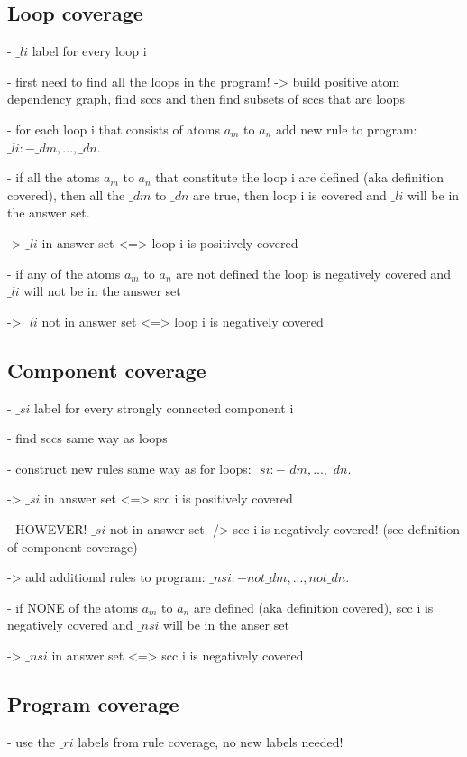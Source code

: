 \subsection{Loop coverage}
\label{subsec:Computing coverage metrics for propositional programs/General approach/Loop coverage}
- $\_li$ label for every loop i

- first need to find all the loops in the program! -> build positive atom dependency graph, find sccs and then find subsets of sccs 
that are loops

- for each loop i that consists of atoms $a_m$ to $a_n$ add new rule to program: $\_li :- \_dm, ..., \_dn$.

- if all the atoms $a_m$ to $a_n$ that constitute the loop i are defined (aka definition covered), then all the $\_dm$ to $\_dn$ are true, 
then loop i is covered and $\_li$ will be in the answer set.

-> $\_li$ in answer set <=> loop i is positively covered

- if any of the atoms $a_m$ to $a_n$ are not defined the loop is negatively covered and  $\_li$ will not be in the answer set

-> $\_li$ not in answer set <=> loop i is negatively covered

\subsection{Component coverage}
\label{subsec:Computing coverage metrics for propositional programs/General approach/Component coverage}
- $\_si$ label for every strongly connected component i

- find sccs same way as loops

- construct new rules same way as for loops: $\_si :- \_dm, ... , \_dn$.

-> $\_si$ in answer set <=> scc i is positively covered

- HOWEVER! $\_si$ not in answer set -/> scc i is negatively covered! (see definition of component coverage)

-> add additional rules to program: $\_nsi :- not \_dm, ..., not \_dn$.

- if NONE of the atoms $a_m$ to $a_n$ are defined (aka definition covered), scc i is negatively covered and $\_nsi$ will be in the anser set

-> $\_nsi$ in answer set <=> scc i is negatively covered

\subsection{Program coverage}
\label{subsec:Computing coverage metrics for propositional programs/General approach/Program coverage}
- use the $\_ri$ labels from rule coverage, no new labels needed!


